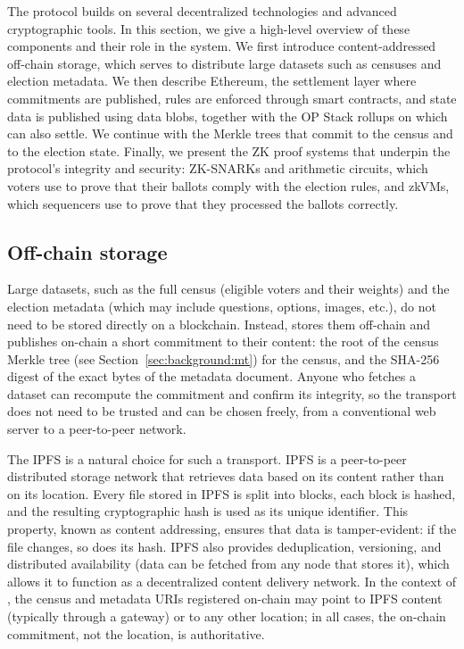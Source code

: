 
The \davinci protocol builds on several decentralized technologies and advanced cryptographic tools. In this section, we give a high-level overview of these components and their role in the system. We first introduce content-addressed off-chain storage, which serves to distribute large datasets such as censuses and election metadata. We then describe Ethereum, the settlement layer where commitments are published, rules are enforced through smart contracts, and state data is published using data blobs, together with the OP Stack rollups on which \davinci can also settle. We continue with the Merkle trees that commit to the census and to the election state. Finally, we present the \ac{ZK} proof systems that underpin the protocol's integrity and security: \acp{ZK-SNARK} and arithmetic circuits, which voters use to prove that their ballots comply with the election rules, and \acp{zkVM}, which sequencers use to prove that they processed the ballots correctly.

\subsection{Off-chain storage}
\label{sec:background:ipfs}

Large datasets, such as the full census (eligible voters and their weights) and the election metadata (which may include questions, options, images, etc.), do not need to be stored directly on a blockchain. Instead, \davinci stores them off-chain and publishes on-chain a short commitment to their content: the root of the census Merkle tree (see Section~\ref{sec:background:mt}) for the census, and the SHA-256 digest of the exact bytes of the metadata document. Anyone who fetches a dataset can recompute the commitment and confirm its integrity, so the transport does not need to be trusted and can be chosen freely, from a conventional web server to a peer-to-peer network.

The \acf{IPFS} is a natural choice for such a transport. \ac{IPFS} is a peer-to-peer distributed storage network that retrieves data based on its content rather than on its location. Every file stored in \ac{IPFS} is split into blocks, each block is hashed, and the resulting cryptographic hash is used as its unique identifier. This property, known as content addressing, ensures that data is tamper-evident: if the file changes, so does its hash. \ac{IPFS} also provides deduplication, versioning, and distributed availability (data can be fetched from any node that stores it), which allows it to function as a decentralized content delivery network. In the context of \davinci, the census and metadata \acp{URI} registered on-chain may point to \ac{IPFS} content (typically through a gateway) or to any other location; in all cases, the on-chain commitment, not the location, is authoritative.

